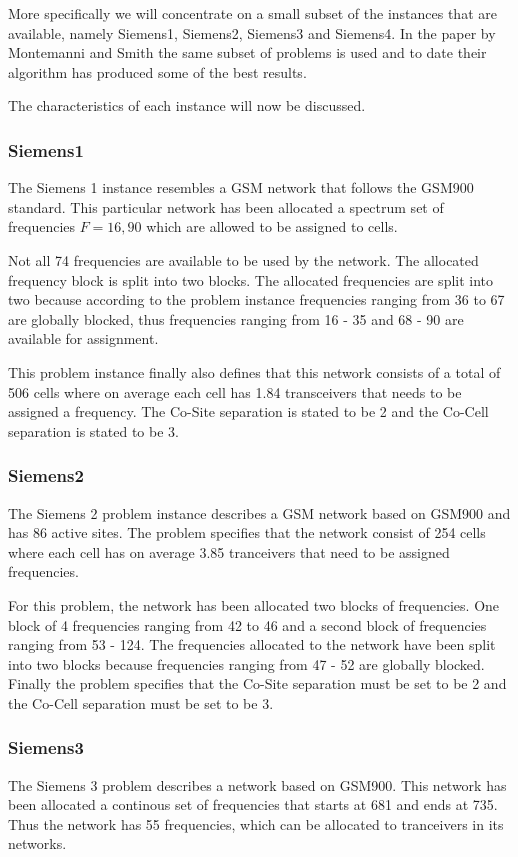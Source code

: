 More specifically we will concentrate on a small subset of the instances that are available, namely Siemens1, Siemens2, Siemens3 and Siemens4. In the paper by Montemanni and Smith \cite{TabuMontemanniSmith} the same subset of problems is used and to date their algorithm has produced some of the best results. %

The characteristics of each instance will now be discussed.
\subsubsection{Siemens1}
The Siemens 1 instance resembles a GSM network that follows the GSM900 standard. This particular network has been allocated a spectrum set of frequencies $F = {16,90}$ which are allowed to be assigned to cells. 

Not all 74 frequencies are available to be used by the network. The allocated frequency block is split into two blocks. The allocated frequencies are split into two because according to the problem instance frequencies ranging from 36 to 67 are globally blocked, thus frequencies ranging from 16  - 35 and 68 - 90 are available for assignment.

This problem instance finally also defines that this network consists of a total of 506 cells where on average each cell has 1.84 transceivers that needs to be assigned a frequency. The Co-Site separation is stated to be 2 and the Co-Cell separation is stated to be 3.
\subsubsection{Siemens2}
The Siemens 2 problem instance describes a GSM network based on GSM900 and has 86 active sites. The problem specifies that the network consist of 254 cells where each cell has on average 3.85 tranceivers that need to be assigned frequencies.

For this problem, the network has been allocated two blocks of frequencies. One block of 4 frequencies ranging from 42 to 46 and a second block of frequencies ranging from 53 - 124. The frequencies allocated to the network have been split into two blocks because frequencies ranging from 47 - 52 are globally blocked. Finally the problem specifies that the Co-Site separation must be set to be 2 and the Co-Cell separation must be set to be 3.
\subsubsection{Siemens3}
The Siemens 3 problem describes a network based on GSM900. This network has been allocated a continous set of frequencies that starts at 681 and ends at 735. Thus the network has 55 frequencies, which can be allocated to tranceivers in its networks.

